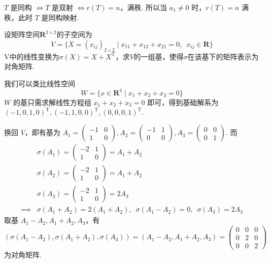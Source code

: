 \begin{exercise}
\begin{exgroup}
\begin{answer}
            $ T $ 是同构 $ \iff T $ 是双射 $ \iff r(T) = n $，满秩. 所以当 $ a_1 \neq 0 $ 时，$ r(T) = n $ 满秩，此时 $ T $ 是同构映射.
        \end{answer}

        \item 设矩阵空间$\mathbf{R}^{2\times 2}$的子空间为
        \[V=\{X=(x_{ij})_{2\times 2} \mid x_{11}+x_{12}+x_{21}=0,\enspace x_{ij}\in \mathbf{R}\}\]
        V中的线性变换为$\sigma(X)=X+X^\mathrm{T}$，求$V$的一组基，使得$\sigma$在该基下的矩阵表示为对角矩阵.

        \begin{answer}
            我们可以类比线性空间
          \[ W = \{ x \in \mathbf{R}^4 \mid x_1 + x_2 + x_3 = 0 \} \]
          $ W $ 的基只需求解线性方程组 $ x_1 + x_2 + x_3 = 0 $ 即可，得到基础解系为 $ (-1, 0, 1, 0)^{\mathrm{T}},\allowbreak (-1, 1, 0, 0)^{\mathrm{T}},\allowbreak (0, 0, 0, 1)^{\mathrm{T}} $.

          换回 $ V $，即有基为 $ A_1 = \begin{pmatrix} -1 & 0 \\ 1 & 0 \end{pmatrix}, A_2 = \begin{pmatrix} -1 & 1 \\ 0 & 0 \end{pmatrix}, A_3 = \begin{pmatrix} 0 & 0 \\ 0 & 1 \end{pmatrix} $. 而
          \begin{align*}
                         & \sigma(A_1) = \begin{pmatrix} -2 & 1 \\ 1 & 0 \end{pmatrix} = A_1 + A_2                      \\
                         & \sigma(A_2) = \begin{pmatrix} -2 & 1 \\ 1 & 0 \end{pmatrix} = A_1 + A_2                      \\
                         & \sigma(A_3) = \begin{pmatrix} -2 & 1 \\ 1 & 0 \end{pmatrix} = 2 A_3                          \\
              \implies{} & \sigma(A_1 + A_2) = 2(A_1 + A_2),\enspace \sigma(A_1 - A_2) = 0,\enspace \sigma(A_3) = 2 A_3
          \end{align*}
          取基 $ A_1 - A_2, A_1 + A_2, A_3 $，有
          \[ (\sigma(A_1 - A_2), \sigma(A_1 + A_2), \sigma(A_3)) = (A_1 - A_2, A_1 + A_2, A_3) = \begin{pmatrix}
                  0 & 0 & 0 \\
                  0 & 2 & 0 \\
                  0 & 0 & 2
              \end{pmatrix} \]
          为对角矩阵.
        \end{answer}


\end{exgroup}
\end{exercise}

